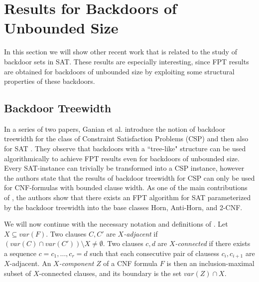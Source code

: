 \documentclass[11pt,a4paper]{article}
\theoremstyle{definition}
\theoremstyle{proposition}
\begin{document}
\section{Results for Backdoors of Unbounded Size}
\label{sec:unboundedbackdoors}

In this section we will show other recent work that is related to the study of backdoor sets in SAT. These results are especially interesting, since FPT results are obtained for backdoors of unbounded size by exploiting some structural properties of these backdoors. 

\subsection{Backdoor Treewidth}

In a series of two papers, Ganian et al. introduce the notion of backdoor treewidth for the class of Constraint Satisfaction Problems (CSP) \cite{GanianCSP} and then also for SAT \cite{GanianBackdoorTreewidth}. They observe that backdoors with a ``tree-like" structure can be used algorithmically to achieve FPT results even for backdoors of unbounded size. Every SAT-instance can trivially be transformed into a CSP instance, however the authors state that the results of backdoor treewidth for CSP can only be used for CNF-formulas with bounded clause width. As one of the main contributions of \cite{GanianBackdoorTreewidth}, the authors show that there exists an FPT algorithm for SAT parameterized by the backdoor treewidth into the base classes Horn, Anti-Horn, and 2-CNF.

We will now continue with the necessary notation and definitions of \cite{GanianBackdoorTreewidth}. 
Let $X \subseteq var(F)$. Two clauses $C,C'$ are \textit{$X$-adjacent} if $(var(C) \cap var(C')) \setminus X \neq \emptyset$. Two clauses $c,d$ are \textit{$X$-connected} if there exists a sequence $c=c_1, \dots , c_r = d$ such that each consecutive pair of clausess $c_i, c_{i+1}$ are $X$-adjacent. An \textit{$X$-component} $Z$ of a CNF formula $F$ is then an inclusion-maximal subset of $X$-connected clauses, and its boundary is the set $var(Z) \cap X$. 
\end{document}
